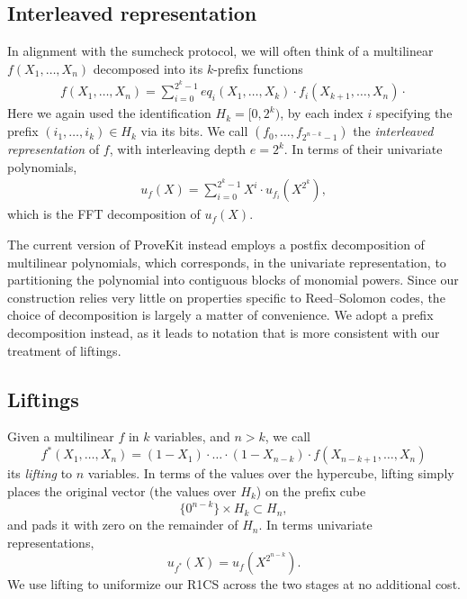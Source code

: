 \subsection{Interleaved representation}

In alignment with the sumcheck protocol, we will often think of a multilinear $f(X_1,\ldots, X_n)$ decomposed into its $k$-prefix functions
\begin{align}
\label{e:prefix:decomp}
f(X_1,\ldots,X_n) =  \sum_{i = 0}^{2^{k}-1} eq_{i}(X_{1},\ldots, X_k) \cdot f_i(X_{k+1},\ldots, X_{n}) \cdot 
\end{align}
Here we again used the identification  $H_k = [0,2^k)$, by each index $i$ specifying the prefix $(i_{1},\ldots, i_{k})\in H_{k}$ via its bits.
We call 
$
(f_0, \ldots, f_{2^{n-k}-1}) %
$
the \textit{interleaved representation} of $f$, with interleaving depth $e = 2^{k}$.
In terms of their univariate polynomials,
\begin{align}
\label{e:FFT:decomp}
u_f(X) = \sum_{i=0}^{2^k-1}  X^{i} \cdot u_{f_i}(X^{2^k}), 
\end{align}
which is the FFT decomposition of $u_f(X)$. 

\begin{rem}%
\label{rem:postfix:decomp}
The current version of ProveKit instead employs a postfix decomposition of multilinear polynomials, which corresponds, in the univariate representation, to partitioning the polynomial into contiguous blocks of monomial powers.
Since our construction relies very little on properties specific to Reed--Solomon codes, the choice of decomposition is largely a matter of convenience. We adopt a prefix decomposition instead, as it leads to notation that is more consistent with our treatment of liftings.
\end{rem}



\subsection{Liftings}

Given a multilinear $f$ in $k$ variables, and $n>k$, we call
\begin{equation}
\label{e:lifting:multilinear}
f^*(X_1,\ldots, X_n) = (1 - X_1)\cdot \ldots \cdot (1 - X_{n-k}) \cdot f(X_{n-k+1},\ldots, X_n)
\end{equation}
its \textit{lifting} to $n$ variables. 
In terms of the values over the hypercube, lifting simply places the original vector (the values over $H_k$) on the prefix cube 
\[
\{0^{n-k}\}\times H_{k} \subset H_n,
\]
and pads it with zero on the remainder of $H_n$.
In terms univariate representations, 
\begin{equation}
u_{f^*}(X) = u_f(X^{2^{n-k}}).
\end{equation}
We use lifting to uniformize our R1CS across the two stages at no additional cost.


